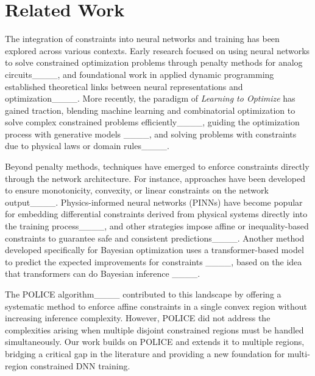 \section{Related Work}
The integration of constraints into neural networks and training has been explored across various contexts. Early research focused on using neural networks to solve constrained optimization problems through penalty methods for analog circuits____, and foundational work in applied dynamic programming established theoretical links between neural representations and optimization____. More recently, the paradigm of \emph{Learning to Optimize} has gained traction, blending machine learning and combinatorial optimization to solve complex constrained problems efficiently____, guiding the optimization process with generative models ____, and solving problems with constraints due to physical laws or domain rules____.

Beyond penalty methods, techniques have emerged to enforce constraints directly through the network architecture. For instance, approaches have been developed to ensure monotonicity, convexity, or linear constraints on the network output____. Physics-informed neural networks (PINNs) have become popular for embedding differential constraints derived from physical systems directly into the training process____, and other strategies impose affine or inequality-based constraints to guarantee safe and consistent predictions____. Another method developed specifically for Bayesian optimization uses a transformer-based model to predict the expected improvements for constraints ____, based on the idea that transformers can do Bayesian inference ____.

The POLICE algorithm____ contributed to this landscape by offering a systematic method to enforce affine constraints in a single convex region without increasing inference complexity. However, POLICE did not address the complexities arising when multiple disjoint constrained regions must be handled simultaneously. Our work builds on POLICE and extends it to multiple regions, bridging a critical gap in the literature and providing a new foundation for multi-region constrained DNN training.